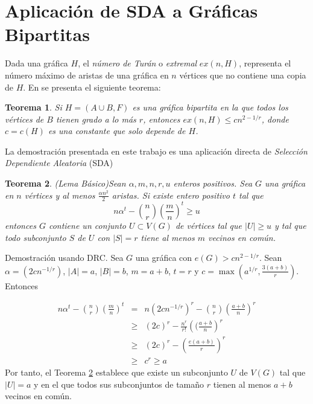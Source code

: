 \documentclass[14pt]{article}
\newtheorem{theorem}{Teorema}
\begin{document}
\section*{Aplicación de SDA a Gráficas Bipartitas}

Dada una gráfica $H$, el \textit{número de Turán} o \textit{extremal}
$ex(n, H)$, representa el número máximo de aristas de una gráfica en
$n$ vértices que no contiene una copia de $H$. En \cite{fox2010drc}
se presenta el siguiente teorema:

\begin{theorem}
  Si $H = (A \cup B, F)$ es una gráfica bipartita en la que todos los
  vértices de $B$ tienen grado
  a lo más $r$, entonces $ex(n, H) \leq c n^{2 - 1 / r}$, donde $c =
  c(H)$ es una constante que solo depende de $H$.
\end{theorem}

La demostración presentada en este trabajo es una aplicación directa
de \textit{Selección Dependiente Aleatoria} (SDA)
\begin{theorem}(Lema Básico)\label{drc}
  Sean $\alpha, m, n, r, u$ enteros positivos. Sea $G$ una gráfica en
  $n$ vértices y al menos $ \frac{\alpha n^2}{2}$ aristas. Si existe
  entero positivo $t$
  tal que
  $$n \alpha^t - \binom{n}{r} \left(\frac{m}{n}\right)^t \geq u$$
  entonces $G$ contiene un conjunto $U \subset V(G)$ de vértices tal que
  $\vert U \vert \geq u$ y tal que todo subconjunto $S$ de $U$ con
  $\vert S \vert = r$
  tiene al menos $m$ vecinos en común.
\end{theorem}
Demostración usando DRC. Sea $G$ una gráfica con $e(G) > c n^{2 -1 /
r}$. Sean $\alpha = (2c n^{-1/r})$,
$\vert A \vert = a$, $\vert B \vert = b$, $m = a + b$, $t = r$
y $c = \max(a^{1/r}, \frac{3(a + b)}{r})$. Entonces

\begin{eqnarray*}
  n \alpha^t - \binom{n}{r} \left(\frac{m}{n}\right)^t &=& n (2c
  n^{-1/r})^r - \binom{n}{r} \left(\frac{a + b}{n}\right)^r\\
  &\geq& (2c)^r - \frac{n^r}{r!} \left((\frac{a + b}{n}\right)^r \\
    &\geq& (2c)^r - \left(\frac{e (a + b)}{r}\right)^r\\
    &\geq& c^r \geq a
  \end{eqnarray*}
  Por tanto, el Teorema \ref{drc} establece que existe un subconjunto
  $U$ de $V(G)$ tal que $\vert U \vert = a$ y en el que todos sus
  subconjuntos de tamaño
  $r$ tienen al menos $a + b$ vecinos en común.
\end{document}
